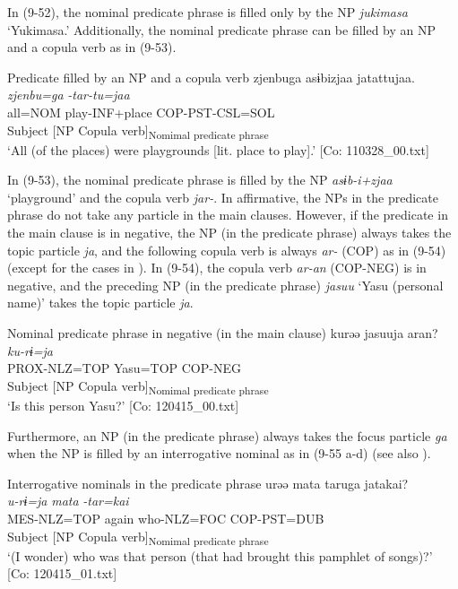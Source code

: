In (9-52), the nominal predicate phrase is filled only by the NP \textit{jukimasa} ‘Yukimasa.’ Additionally, the nominal predicate phrase can be filled by an NP and a copula verb as in (9-53).

\ea   Predicate filled by an NP and a copula verb \label{ex:9.53}
 \gllll  zjenbuga  asɨbizjaa  jatattujaa.\\
    \textit{zjenbu=ga}  \textit{}  \textit{-tar-tu=jaa}\\
    all=NOM  play-INF+place  COP-PST-CSL=SOL\\
    Subject  [NP  Copula verb]\textsubscript{Nomimal predicate phrase}\\
    \glt     ‘All (of the places) were playgrounds [lit. place to play].’ [Co: 110328\_00.txt]
\z

In (9-53), the nominal predicate phrase is filled by the NP \textit{asɨb-i+zjaa} ‘playground’ and the copula verb \textit{jar-}. In affirmative, the NPs in the predicate phrase do not take any particle in the main clauses. However, if the predicate in the main clause is in negative, the NP (in the predicate phrase) always takes the topic particle \textit{ja}, and the following copula verb is always \textit{ar-} (COP) as in (9-54) (except for the cases in ). In (9-54), the copula verb \textit{ar-an} (COP-NEG) is in negative, and the preceding NP (in the predicate phrase) \textit{jasuu} ‘Yasu (personal name)’ takes the topic particle \textit{ja}.

\ea   Nominal predicate phrase in negative (in the main clause) \label{ex:9.54}
 \gllll  kurəə  jasuuja  aran?\\
    \textit{ku-rɨ=ja}  \textit{}  \textit{}\\
    PROX-NLZ=TOP  Yasu=TOP  COP-NEG\\
    Subject  [NP  Copula verb]\textsubscript{Nomimal predicate phrase}\\
    \glt     ‘Is this person Yasu?’ [Co: 120415\_00.txt]
\z

Furthermore, an NP (in the predicate phrase) always takes the focus particle \textit{ga} when the NP is filled by an interrogative nominal as in (9-55 a-d) (see also ).

\ea   Interrogative nominals in the predicate phrase  \label{ex:9.55}
\ea %
 \gllll  urəə  mata  taruga  jatakai?\\
      \textit{u-rɨ=ja}  \textit{mata}  \textit{}  \textit{-tar=kai}\\
      MES-NLZ=TOP  again  who-NLZ=FOC  COP-PST=DUB\\
      Subject    [NP  Copula verb]\textsubscript{Nomimal predicate phrase}\\
      \glt       ‘(I wonder) who was that person (that had brought this pamphlet of songs)?’ [Co: 120415\_01.txt]

